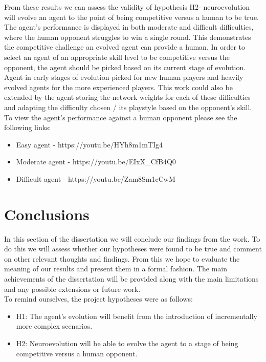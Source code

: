\documentclass[12pt,a4paper]{article}
\begin{document}
From these results we can assess the validity of hypothesis H2- neuroevolution will evolve an agent to the point of being competitive versus a human to be true. The agent's performance is displayed in both moderate and difficult difficulties, where the human opponent struggles to win a single round. This demonstrates the competitive challenge an evolved agent can provide a human. In order to select an agent of an appropriate skill level to be competitive versus the opponent, the agent should be picked based on its current stage of evolution. Agent in early stages of evolution picked for new human players and heavily evolved agents for the more experienced players. This work could also be extended by the agent storing the network weights for each of these difficulties and adapting the difficulty chosen / its playstyle based on the opponent's skill.\\

To view the agent's performance against a human opponent please see the following links:
\begin{itemize}
\item {Easy agent - https://youtu.be/HYh8m1mTIg4}
\item {Moderate agent - https://youtu.be/EIxX\_CfB4Q0}
\item {Difficult agent - https://youtu.be/Zam8Sm1cCwM}
\end{itemize}
\newpage
\section{Conclusions}

In this section of the dissertation we will conclude our findings from the work. To do this we will assess whether our hypotheses were found to be true and comment on other relevant thoughts and findings. From this we hope to evaluate the meaning of our results and present them in a formal fashion. The main achievements of the dissertation will be provided along with the main limitations and any possible extensions or future work.\\

To remind ourselves, the project hypotheses were as follows: 
\begin{itemize}
\item {H1: The agent's evolution will benefit from the introduction of incrementally more complex scenarios.}
\item {H2: Neuroevolution will be able to evolve the agent to a stage of being competitive versus a human opponent.}
\end{itemize}
\end{document}
